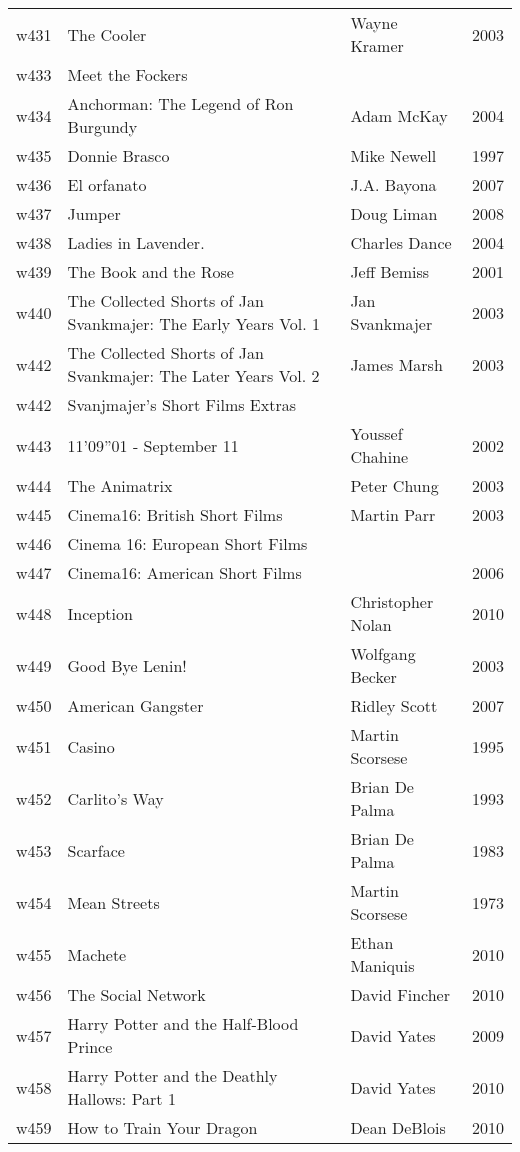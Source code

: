 \documentclass{article}
\begin{document}
\begin {center}
\begin{longtable}{l p{10cm} l l}
w431 & The Cooler & Wayne Kramer & 2003 \\
w433 & Meet the Fockers &  &  \\
w434 & Anchorman: The Legend of Ron Burgundy & Adam McKay & 2004 \\
w435 & Donnie Brasco & Mike Newell & 1997 \\
w436 & El orfanato & J.A. Bayona & 2007 \\
w437 & Jumper & Doug Liman & 2008 \\
w438 & Ladies in Lavender. & Charles Dance & 2004 \\
w439 & The Book and the Rose & Jeff Bemiss & 2001 \\
w440 & The Collected Shorts of Jan Svankmajer: The Early Years Vol. 1 & Jan Svankmajer & 2003 \\
w442 & The Collected Shorts of Jan Svankmajer: The Later Years Vol. 2 & James Marsh & 2003 \\
w442 & Svanjmajer's Short Films Extras &  &  \\
w443 & 11'09''01 - September 11 & Youssef Chahine & 2002 \\
w444 & The Animatrix & Peter Chung & 2003 \\
w445 & Cinema16: British Short Films & Martin Parr & 2003 \\
w446 & Cinema 16: European Short Films &  &  \\
w447 & Cinema16: American Short Films &  & 2006 \\
w448 & Inception & Christopher Nolan & 2010 \\
w449 & Good Bye Lenin! & Wolfgang Becker & 2003 \\
w450 & American Gangster & Ridley Scott & 2007 \\
w451 & Casino & Martin Scorsese & 1995 \\
w452 & Carlito's Way & Brian De Palma & 1993 \\
w453 & Scarface & Brian De Palma & 1983 \\
w454 & Mean Streets & Martin Scorsese & 1973 \\
w455 & Machete & Ethan Maniquis & 2010 \\
w456 & The Social Network & David Fincher & 2010 \\
w457 & Harry Potter and the Half-Blood Prince & David Yates & 2009 \\
w458 & Harry Potter and the Deathly Hallows: Part 1 & David Yates & 2010 \\
w459 & How to Train Your Dragon & Dean DeBlois & 2010 \\

\end{longtable}
\end{center}
\end{document}
